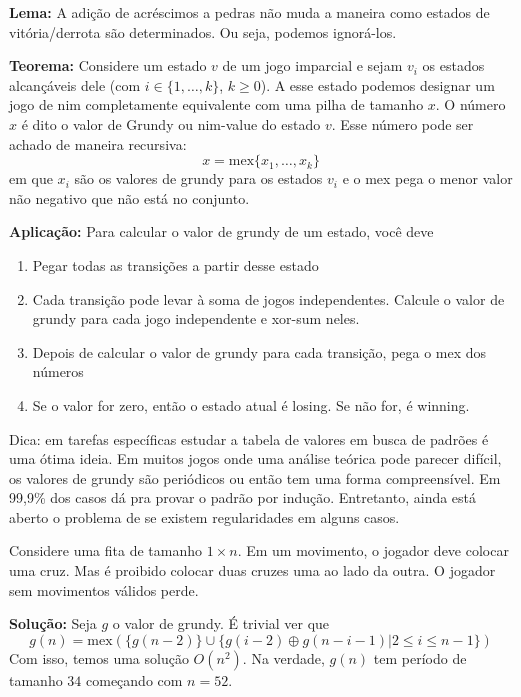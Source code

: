 \textbf{Lema:} A adição de acréscimos a pedras não muda a maneira como estados de vitória/derrota são determinados. Ou seja, podemos ignorá-los.

\textbf{Teorema:} Considere um estado $v$ de um jogo imparcial e sejam $v_i$ os estados alcançáveis dele (com $i \in \{1, \dots, k\}$, $k \geq 0$). A esse estado podemos designar um jogo de nim completamente equivalente com uma pilha de tamanho $x$. O número $x$ é dito o valor de Grundy ou nim-value do estado $v$. Esse número pode ser achado de maneira recursiva: 
$$x = \text{mex} \{ x_1 , \dots, x_k\}$$
em que $x_i$ são os valores de grundy para os estados $v_i$ e o mex pega o menor valor não negativo que não está no conjunto.

\textbf{Aplicação:} Para calcular o valor de grundy de um estado, você deve
\begin{enumerate}
    \item Pegar todas as transições a partir desse estado
    \item Cada transição pode levar à soma de jogos independentes. Calcule o valor de grundy para cada jogo independente e xor-sum neles.
    \item Depois de calcular o valor de grundy para cada transição, pega o mex dos números
    \item Se o valor for zero, então o estado atual é losing. Se não for, é winning.
\end{enumerate}

Dica: em tarefas específicas estudar a tabela de valores em busca de padrões é uma ótima ideia. Em muitos jogos onde uma análise teórica pode parecer difícil, os valores de grundy são periódicos ou então tem uma forma compreensível. Em 99,9\% dos casos dá pra provar o padrão por indução. Entretanto, ainda está aberto o problema de se existem regularidades em alguns casos.

 Considere uma fita de tamanho $1 \times n$. Em um movimento, o jogador deve colocar uma cruz. Mas é proibido colocar duas cruzes uma ao lado da outra. O jogador sem movimentos válidos perde.

\textbf{Solução:} Seja $g$ o valor de grundy. É trivial ver que
$$g(n) = \text{mex} \left( \{ g(n-2) \} \cup \{ g(i-2) \oplus g(n-i-1) | 2 \leq i \leq n-1\} \right)$$
Com isso, temos uma solução $O(n^2)$. Na verdade, $g(n)$ tem período de tamanho $34$ começando com $n=52$.